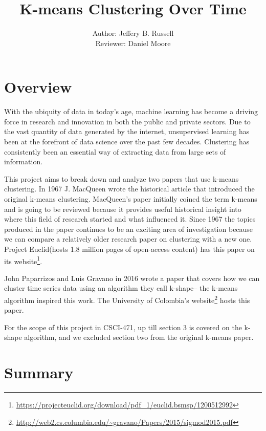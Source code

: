 \documentclass[12pt]{apa6}
\title{K-means Clustering Over Time}
\author{Author: Jeffery B. Russell\\ Reviewer: Daniel Moore}
\affiliation{%
 Computer Science at RIT\\
}%
\begin{document}
\maketitle


\section{Overview}


With the ubiquity of data in today's age, machine learning has become a driving force in research and innovation in both the public and private sectors. Due to the vast quantity of data generated by the internet, unsupervised learning has been at the forefront of data science over the past few decades. Clustering has consistently been an essential way of extracting data from large sets of information.

This project aims to break down and analyze two papers that use k-means clustering. In 1967 J. MacQueen wrote the historical article that introduced \cite{k-means} the original k-means clustering. MacQueen's paper initially coined the term k-means\cite{k-means} and is going to be reviewed because it provides useful historical insight into where this field of research started and what influenced it. Since 1967 the topics produced in the paper continues to be an exciting area of investigation because we can compare a relatively older research paper on clustering with a new one. Project Euclid(hosts 1.8 million pages of open-access content) has this paper on its website\footnote{\url{https://projecteuclid.org/download/pdf_1/euclid.bsmsp/1200512992}}.

John Paparrizos and Luis Gravano in 2016 wrote a paper that covers how we can cluster time series data using an algorithm they call k-shape-- the k-means algorithm \cite{k-shape} inspired this work. The University of Colombia's website\footnote{\url{http://web2.cs.columbia.edu/~gravano/Papers/2015/sigmod2015.pdf}} hosts this paper.

For the scope of this project in CSCI-471, up till section 3 is covered on the k-shape algorithm, and we excluded section two from the original k-means paper. 

\section{Summary}

\end{document}
